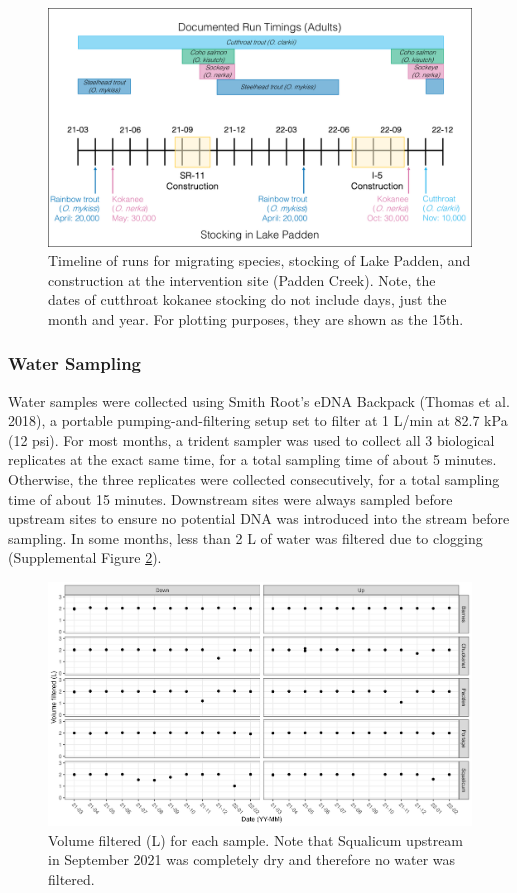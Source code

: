 \documentclass[
]{article}
\begin{document}
\begin{figure}
\centering
\includegraphics{../Output/SupplementalFigures/TimeLine.pdf}
\caption{Timeline of runs for migrating species, stocking of Lake
Padden, and construction at the intervention site (Padden Creek). Note,
the dates of cutthroat kokanee stocking do not include days, just the
month and year. For plotting purposes, they are shown as the
15th.\label{fig:timeline}}
\end{figure}

\hypertarget{water-sampling}{%
\subsubsection{Water Sampling}\label{water-sampling}}

Water samples were collected using Smith Root's eDNA Backpack (Thomas et
al. 2018), a portable pumping-and-filtering setup set to filter at 1
L/min at 82.7 kPa (12 psi). For most months, a trident sampler was used
to collect all 3 biological replicates at the exact same time, for a
total sampling time of about 5 minutes. Otherwise, the three replicates
were collected consecutively, for a total sampling time of about 15
minutes. Downstream sites were always sampled before upstream sites to
ensure no potential DNA was introduced into the stream before sampling.
In some months, less than 2 L of water was filtered due to clogging
(Supplemental Figure \ref{fig:volfiltered}).

\begin{figure}
\centering
\includegraphics{../Output/SupplementalFigures/volume_filtered_by_sample.png}
\caption{Volume filtered (L) for each sample. Note that Squalicum
upstream in September 2021 was completely dry and therefore no water was
filtered.\label{fig:volfiltered}}
\end{figure}
\end{document}
